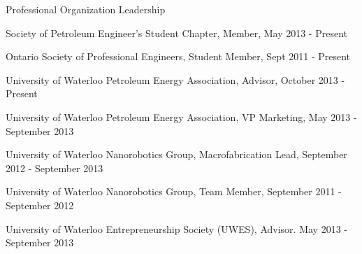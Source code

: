 \documentclass{resume} %
\begin{document}

\begin{rSection}{Professional Organization Leadership}

\item Society of Petroleum Engineer's Student Chapter, Member, May 2013 - Present
\item Ontario Society of Professional Engineers, Student Member, Sept 2011 - Present
\item University of Waterloo Petroleum Energy Association, Advisor,  October 2013 - Present
\item University of Waterloo Petroleum Energy Association, VP Marketing, May 2013 - September 2013
\item University of Waterloo Nanorobotics Group, Macrofabrication Lead, September 2012 - September 2013
\item University of Waterloo Nanorobotics Group, Team Member, September 2011 - September 2012
\item University of Waterloo Entrepreneurship Society (UWES), Advisor. May 2013 - September 2013

\end{rSection}	



\end{document}
